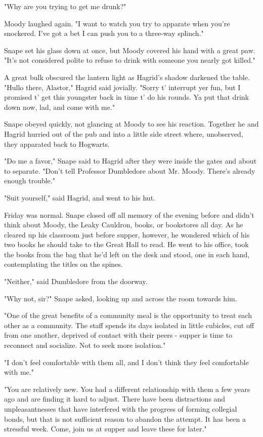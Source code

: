 "Why are you trying to get me drunk?"

Moody laughed again. "I want to watch you try to apparate when you're snockered. I've got a bet I can push you to a three-way splinch."

Snape set his glass down at once, but Moody covered his hand with a great paw. "It's not considered polite to refuse to drink with someone you nearly got killed."

A great bulk obscured the lantern light as Hagrid's shadow darkened the table. "Hullo there, Alastor," Hagrid said jovially. "Sorry t' interrupt yer fun, but I promised t' get this youngster back in time t' do his rounds. Ya put that drink down now, lad, and come with me."

Snape obeyed quickly, not glancing at Moody to see his reaction. Together he and Hagrid hurried out of the pub and into a little side street where, unobserved, they apparated back to Hogwarts.

"Do me a favor," Snape said to Hagrid after they were inside the gates and about to separate. "Don't tell Professor Dumbledore about Mr. Moody. There's already enough trouble."

"Suit yourself," said Hagrid, and went to his hut.

Friday was normal. Snape closed off all memory of the evening before and didn't think about Moody, the Leaky Cauldron, books, or bookstores all day. As he cleared up his classroom just before supper, however, he wondered which of his two books he should take to the Great Hall to read. He went to his office, took the books from the bag that he'd left on the desk and stood, one in each hand, contemplating the titles on the spines.

"Neither," said Dumbledore from the doorway.

"Why not, sir?" Snape asked, looking up and across the room towards him.

"One of the great benefits of a community meal is the opportunity to treat each other as a community. The staff spends its days isolated in little cubicles, cut off from one another, deprived of contact with their peers - supper is time to reconnect and socialize. Not to seek more isolation."

"I don't feel comfortable with them all, and I don't think they feel comfortable with me."

"You are relatively new. You had a different relationship with them a few years ago and are finding it hard to adjust. There have been distractions and unpleasantnesses that have interfered with the progress of forming collegial bonds, but that is not sufficient reason to abandon the attempt. It has been a stressful week. Come, join us at supper and leave these for later."

